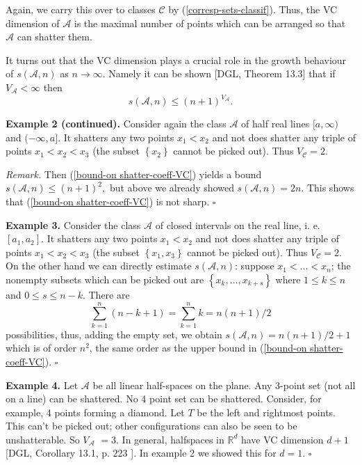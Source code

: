 \documentclass[11pt,twoside]{article}%
\theoremstyle{change}
\begin{document}
Again, we carry this over to classes $\mathcal{C}$ by
(\ref{corresp-sets-classif}). Thus, the VC dimension of $\mathcal{A}$ is the
maximal number of points which can be arranged so that $\mathcal{A}$ can
shatter them.

It turns out that the VC dimension plays a crucial role in the growth
behaviour of $s\left(  \mathcal{A},n\right)  $ as $n\rightarrow\infty$. Namely
it can be shown [DGL, Theorem 13.3] that if $V_{\mathcal{A}}<\infty$ then
\begin{equation}
s\left(  \mathcal{A},n\right)  \leq\left(  n+1\right)  ^{V_{\mathcal{A}}%
}.\label{bound-on shatter-coeff-VC}%
\end{equation}


\textbf{Example 2 (continued). }Consider again the class $\mathcal{A}$ of half
real lines $[a,\infty)$ and $(-\infty,a]$. It shatters any two points
$x_{1}<x_{2}$ and not does shatter any triple of points $x_{1}<x_{2}<x_{3}$
(the subset $\left\{  x_{2}\right\}  $ cannot be picked out). Thus
$V_{\mathcal{C}}=2$.

\textit{Remark. }Then (\ref{bound-on shatter-coeff-VC}) yields a bound
$s\left(  \mathcal{A},n\right)  \leq\left(  n+1\right)  ^{2},$ but above we
already showed $s\left(  \mathcal{A},n\right)  =2n.$ This shows that
(\ref{bound-on shatter-coeff-VC}) is not sharp. $\square$\bigskip\bigskip

\textbf{Example 3. }Consider the class $\mathcal{A}$ of closed intervals on
the real line, i. e. $[a_{1},a_{2}]$. It shatters any two points $x_{1}<x_{2}
$ and not does shatter any triple of points $x_{1}<x_{2}<x_{3}$ (the subset
$\left\{  x_{1},x_{3}\right\}  $ cannot be picked out). Thus $V_{\mathcal{C}%
}=2$. On the other hand we can directly estimate $s\left(  \mathcal{A}%
,n\right)  $: suppose $x_{1}<\ldots<x_{n}$; the nonempty subsets which can be
picked out are $\left\{  x_{k},\ldots,x_{k+s}\right\}  $ where $1\leq k\leq n$
and $0\leq s\leq n-k$. There are
\[
\sum_{k=1}^{n}(n-k+1)=\sum_{k=1}^{n}k=n\left(  n+1\right)  /2
\]
possibilities, thus, adding the empty set, we obtain $s\left(  \mathcal{A}%
,n\right)  =n\left(  n+1\right)  /2+1$ which is of order $n^{2}$, the same
order as the upper bound in (\ref{bound-on shatter-coeff-VC}). $\square
$\bigskip\bigskip

\textbf{Example 4.} Let $\mathcal{A}$ be all linear half-spaces on the plane.
Any 3-point set (not all on a line) can be shattered. No 4 point set can be
shattered. Consider, for example, 4 points forming a diamond. Let $T$ be the
left and rightmost points. This can't be picked out; other configurations can
also be seen to be unshatterable. So $V_{\mathcal{A}}$ $=3 $. In general,
halfspaces in $\mathbb{R}^{d}$ have VC dimension $d+1$ [DGL, Corollary 13.1,
p. 223 ]. In example 2 we showed this for $d=1.$ $\square$\bigskip\bigskip
\end{document}
